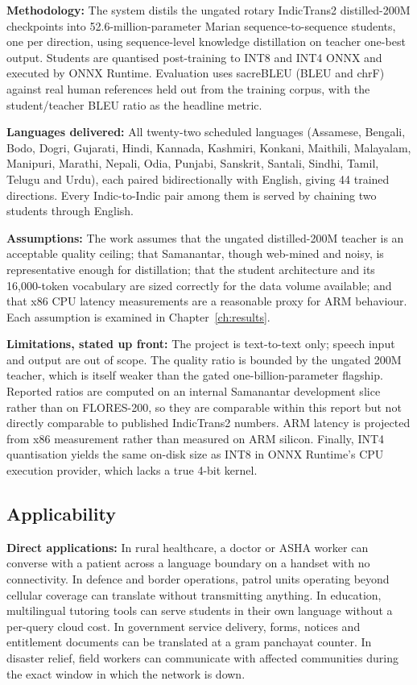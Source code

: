 \textbf{Methodology:} The system distils the ungated rotary IndicTrans2
distilled-200M checkpoints into 52.6-million-parameter Marian sequence-to-sequence
students, one per direction, using sequence-level knowledge distillation on
teacher one-best output. Students are quantised post-training to INT8 and INT4
ONNX and executed by ONNX Runtime. Evaluation uses sacreBLEU (BLEU and chrF)
against real human references held out from the training corpus, with the
student/teacher BLEU ratio as the headline metric.

\textbf{Languages delivered:} All twenty-two scheduled languages (Assamese,
Bengali, Bodo, Dogri, Gujarati, Hindi, Kannada, Kashmiri, Konkani, Maithili,
Malayalam, Manipuri, Marathi, Nepali, Odia, Punjabi, Sanskrit, Santali, Sindhi,
Tamil, Telugu and Urdu), each paired bidirectionally with English, giving 44
trained directions. Every Indic-to-Indic pair among them is served by chaining
two students through English.

\textbf{Assumptions:} The work assumes that the ungated distilled-200M teacher is
an acceptable quality ceiling; that Samanantar, though web-mined and noisy, is
representative enough for distillation; that the student architecture and its
16{,}000-token vocabulary are sized correctly for the data volume available; and
that x86 CPU latency measurements are a reasonable proxy for ARM behaviour.
Each assumption is examined in Chapter~\ref{ch:results}.

\textbf{Limitations, stated up front:} The project is text-to-text only; speech
input and output are out of scope. The quality ratio is bounded by the ungated 200M teacher, which is itself weaker than
the gated one-billion-parameter flagship. Reported ratios are computed on an
internal Samanantar development slice rather than on FLORES-200, so they are
comparable within this report but not directly comparable to published
IndicTrans2 numbers. ARM latency is projected from x86 measurement rather than
measured on ARM silicon. Finally, INT4 quantisation yields the same on-disk size
as INT8 in ONNX Runtime's CPU execution provider, which lacks a true 4-bit
kernel.

\subsection{Applicability}
\label{subsec:applicability}

\textbf{Direct applications:} In rural healthcare, a doctor or ASHA worker can
converse with a patient across a language boundary on a handset with no
connectivity. In defence and border operations, patrol units operating beyond
cellular coverage can translate without transmitting anything. In education,
multilingual tutoring tools can serve students in their own language without a
per-query cloud cost. In government service delivery, forms, notices and
entitlement documents can be translated at a gram panchayat counter. In disaster
relief, field workers can communicate with affected communities during the exact
window in which the network is down.

